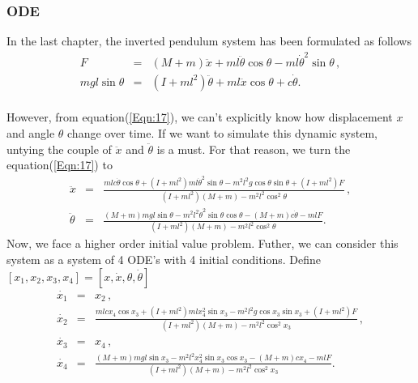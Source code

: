 \documentclass[a4paper,11pt]{article}
\begin{document}
\subsubsection{ODE}
In the last chapter, the inverted pendulum system has been formulated as follows
\begin{eqnarray}
	F &=& (M+m)\ddot{x} + ml\ddot{\theta}\cos{\theta} - ml\dot{\theta}^2\sin{\theta} \, , \nonumber \\ 
	mgl\sin{\theta} &=& (I+ml^2)\ddot{\theta} + ml\ddot{x}\cos{\theta} + c\dot{\theta}. \label{Eqn:17}
\end{eqnarray} 
\\
However, from equation(\ref{Eqn:17}), we can't explicitly know how displacement $x$ and angle $\theta$ change over time.
If we want to simulate this dynamic system, untying the couple of $\ddot{x}$ and $\ddot{\theta}$ is a must.
For that reason, we turn the equation(\ref{Eqn:17}) to
\begin{eqnarray}
	\ddot{x} &=& \frac{mlc\dot{\theta}\cos{\theta} + (I+ml^2)ml\dot{\theta}^2\sin{\theta} -m^2l^2g\cos{\theta}\sin{\theta} + (I+ml^2)F}   {(I+ml^2)(M+m) - m^2l^2\cos^2{\theta}} \, , \nonumber \\ 
	\ddot{\theta} &=& \frac{(M+m)mgl\sin{\theta} -m^2l^2\dot{\theta}^2\sin{\theta}\cos{\theta} -(M+m)c\dot{\theta}-mlF}   {(I+ml^2)(M+m) - m^2l^2\cos^2{\theta}}. \label{Eqn:18}
\end{eqnarray} 
Now, we face a higher order initial value problem. Futher, we can consider this system as a system of 4 ODE's with 4 initial conditions.
Define $ [x_1,x_2,x_3,x_4] = [x,\dot x,\theta, \dot \theta]$
\begin{eqnarray}
	\dot{x_1} &=& x_2 \, , \nonumber \\
	\dot{x_2} &=& \frac{mlcx_4\cos{x_3} + (I+ml^2)mlx_4^2\sin{x_3} -m^2l^2g\cos{x_3}\sin{x_3} + (I+ml^2)F}   {(I+ml^2)(M+m) - m^2l^2\cos^2{x_3}} \, , \nonumber \\ 
	\dot{x_3} &=& x_4 \, , \nonumber \\
	\dot{x_4} &=& \frac{(M+m)mgl\sin{x_3} -m^2l^2x_4^2\sin{x_3}\cos{x_3} -(M+m)cx_4-mlF}   {(I+ml^2)(M+m) - m^2l^2\cos^2{x_3}}. \label{Eqn:19}
\end{eqnarray} 
\end{document}
